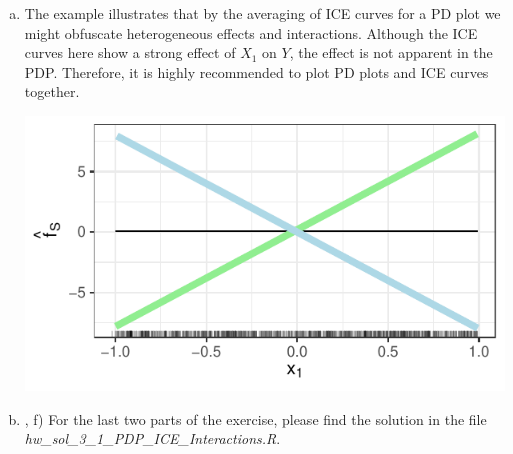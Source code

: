 {\begin{enumerate} [a)]
  The light green dots correspond to group $X_2 = 1$, the light blue dots to group $X_2 = 0$.
  
   \item
   The example illustrates that by the averaging of ICE curves for a PD plot we might obfuscate heterogeneous effects and interactions. 
   Although the ICE curves here show a strong effect of $X_1$ on $Y$, the effect is not apparent in the PDP.
   Therefore, it is highly recommended to plot PD plots and ICE curves together. 

    \begin{center}
      \includegraphics[width=\maxwidth]{figure/pdpinteraction_ICE_curve_sol.pdf}
    \end{center}

    \item , f) For the last two parts of the exercise, please find the solution in the file \textit{hw\_sol\_3\_1\_PDP\_ICE\_Interactions.R}.

  
\end{enumerate}
}